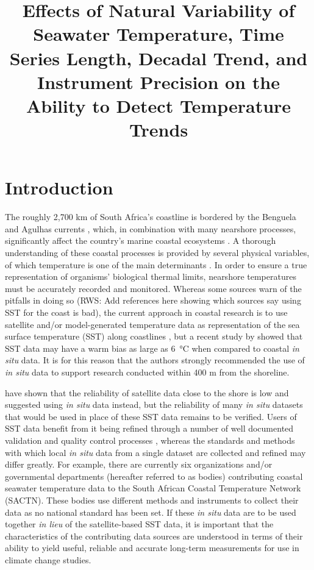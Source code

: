 \documentclass{ametsoc}
\title{Effects of Natural Variability of Seawater Temperature, Time Series Length, Decadal Trend, and Instrument Precision on the Ability to Detect Temperature Trends}
\affiliation{Department of Biodiversity and Conservation Biology, University of the Western Cape, Bellville, Republic of South Africa}
\begin{document}
\maketitle

\section{Introduction}
The roughly 2,700 km of South Africa's coastline is bordered by the Benguela and Agulhas currents \citep[e.g.][]{Roberts2005,Hutchings2009}, which, in combination with many nearshore processes, significantly affect the country's marine coastal ecosystems \citep{Santos2012a}. A thorough understanding of these coastal processes is provided by several physical variables, of which temperature is one of the main determinants \citep[e.g.][]{Blanchette2008, Tittensor2010, Couce2012}. In order to ensure a true representation of organisms' biological thermal limits, nearshore temperatures must be accurately recorded and monitored. Whereas some sources warn of the pitfalls in doing so (RWS: Add references here showing which sources say using SST for the coast is bad), the current approach in coastal research is to use satellite and/or model-generated temperature data as representation of the sea surface temperature (SST) along coastlines \citep[e.g.][]{Blanchette2008, Broitman2008a, Tyberghein2012}, but a recent study by \citet{Smit2013} showed that SST data may have a warm bias as large as \SI{6}{\degreeCelsius} when compared to coastal \emph{in situ} data. It is for this reason that the authors strongly recommended the use of \emph{in situ} data to support research conducted within 400 m from the shoreline.

\citet{Smit2013} have shown that the reliability of satellite data close to the shore is low and suggested using \emph{in situ} data instead, but the reliability of many \emph{in situ} datasets that would be used in place of these SST data remains to be verified. Users of SST data benefit from it being refined through a number of well documented validation and quality control processes \citep[e.g.][]{Reynolds1994, Brown1999, Martin2012}, whereas the standards and methods with which local \emph{in situ} data from a single dataset are collected and refined may differ greatly. For example, there are currently six organizations and/or governmental departments (hereafter referred to as bodies) contributing coastal seawater temperature data to the South African Coastal Temperature Network (SACTN). These bodies use different methods and instruments to collect their data as no national standard has been set. If these \emph{in situ} data are to be used together \emph{in lieu} of the satellite-based SST data, it is important that the characteristics of the contributing data sources are understood in terms of their ability to yield useful, reliable and accurate long-term measurements for use in climate change studies.
\end{document}

